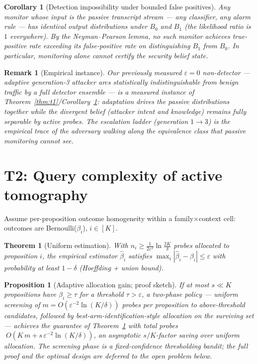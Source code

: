 \documentclass[11pt]{article}
\newtheorem{theorem}{Theorem}
\newtheorem{corollary}{Corollary}
\newtheorem{proposition}{Proposition}
\newtheorem{remark}{Remark}
\begin{document}
\begin{corollary}[Detection impossibility under bounded false positives]\label{cor:t1}
Any monitor whose input is the passive transcript stream --- any classifier, any alarm rule --- has identical output distributions under $B_0$ and $B_1$ (the likelihood ratio is $1$ everywhere). By the Neyman--Pearson lemma, no such monitor achieves true-positive rate exceeding its false-positive rate on distinguishing $B_1$ from $B_0$. In particular, monitoring alone cannot certify the security belief state.
\end{corollary}

\begin{remark}[Empirical instance]
Our previously measured $\varepsilon=0$ non-detector --- adaptive generation-3 attacker arcs statistically indistinguishable from benign traffic by a full detector ensemble --- is a measured instance of Theorem~\ref{thm:t1}/Corollary~\ref{cor:t1}: adaptation drives the passive distributions together while the divergent belief (attacker intent and knowledge) remains fully separable by active probes. The escalation ladder (generation $1 \to 3$) is the empirical trace of the adversary walking along the equivalence class that passive monitoring cannot see.
\end{remark}

\section{T2: Query complexity of active tomography}

Assume per-proposition outcome homogeneity within a family$\times$context cell: outcomes are Bernoulli($\beta_i$), $i \in [K]$.

\begin{theorem}[Uniform estimation]\label{thm:t2}
With $n_i \geq \frac{1}{2\varepsilon^2}\ln\frac{2K}{\delta}$ probes allocated to proposition $i$, the empirical estimator $\hat\beta_i$ satisfies
$\max_i |\hat\beta_i - \beta_i| \leq \varepsilon$
with probability at least $1-\delta$ (Hoeffding + union bound).
\end{theorem}

\begin{proposition}[Adaptive allocation gain; proof sketch]\label{prop:adaptive}
If at most $s \ll K$ propositions have $\beta_i \geq \tau$ for a threshold $\tau > \varepsilon$, a two-phase policy --- uniform screening of $m = O(\varepsilon^{-2}\ln(K/\delta))$ probes per proposition to above-threshold candidates, followed by best-arm-identification-style allocation on the surviving set --- achieves the guarantee of Theorem~\ref{thm:t2} with total probes
$\;O\!\left(K\,m + s\,\varepsilon^{-2}\ln(K/\delta)\right)$,
an asymptotic $s/K$-factor saving over uniform allocation. The screening phase is a fixed-confidence thresholding bandit; the full proof and the optimal design are deferred to the open problem below.
\end{proposition}
\end{document}
